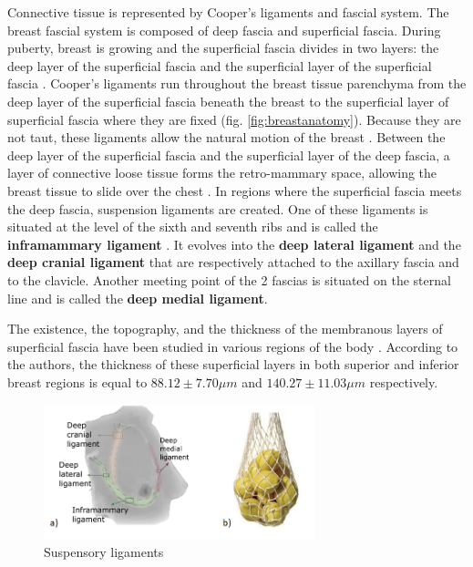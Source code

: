 Connective tissue is represented by Cooper's ligaments and fascial system. The breast fascial system is composed of deep fascia and superficial fascia. During puberty, breast is growing and the superficial fascia divides in two layers: the deep layer of the superficial fascia and the superficial layer of the superficial fascia \citep{kopans2007breast}.  Cooper's ligaments run throughout the breast tissue parenchyma from the deep layer of the superficial fascia beneath the breast to the superficial layer of superficial fascia where they are fixed (fig. \ref{fig:breastanatomy}). Because they are not taut, these ligaments allow the natural motion of the breast \citep{clemente2011anatomy}. Between the deep layer of  the superficial fascia and the superficial layer of the deep fascia, a layer of connective loose tissue forms the retro-mammary space, allowing the breast tissue to slide over the chest \citep{mugea2014aesthetic}. In regions where the superficial fascia meets the deep fascia, suspension ligaments are created. One of these ligaments is situated at the level of the sixth and seventh ribs and is called the \textbf{inframammary ligament} \citep{bayati_inframammary_1995}. It evolves into the \textbf{deep lateral ligament} and the \textbf{deep cranial ligament} that are respectively attached to the axillary fascia and to the clavicle. Another meeting point of the 2 fascias is situated on the sternal line and is called the \textbf{deep medial ligament}. 

The existence, the topography, and the thickness of the membranous layers of superficial fascia have been studied in various regions of the body \citep{abu_membranous_2006}. According to the authors, the thickness of these superficial layers in both superior and inferior breast regions is equal to $88.12 \pm 7.70 \mu m$ and $140.27 \pm 11.03 \mu m$ respectively.

\begin{figure}[!h]
\centering
\centerline{\includegraphics[width=0.7\textwidth,keepaspectratio]{figures/breastLigaments2.png} }
\caption{Suspensory ligaments}
\label{fig:suspensoryligaments}
\end{figure}


